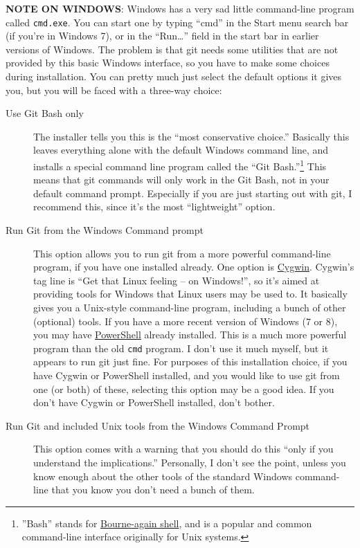 \documentclass{article}
\begin{document}
\textbf{NOTE ON WINDOWS}: Windows has a very sad little command-line program called \texttt{cmd.exe}. You can start one by typing ``cmd'' in the Start menu search bar (if you're in Windows 7), or in the ``Run\ldots{}'' field in the start bar in earlier versions of Windows. The problem is that git needs some utilities that are not provided by this basic Windows interface, so you have to make some choices during installation. You can pretty much just select the default options it gives you, but you will be faced with a three-way choice:
\begin{description}
\item[Use Git Bash only] The installer tells you this is the ``most conservative choice.'' Basically this leaves everything alone with the default Windows command line, and installs a special command line program called the ``Git Bash.''\footnote{''Bash'' stands for \href{http://en.wikipedia.org/wiki/Bash_(Unix_shell)}{Bourne-again shell}, and is a popular and common command-line interface originally for Unix systems.
 } This means that git commands will only work in the Git Bash, not in your default command prompt.  Especially if you are just starting out with git, I recommend this, since it's the most ``lightweight'' option.
\item[Run Git from the Windows Command prompt] This option allows you to run git from a more powerful command-line program, if you have one installed already. One option is \href{http://www.cygwin.com/}{Cygwin}. Cygwin's tag line is ``Get that Linux feeling -- on Windows!'', so it's aimed at providing tools for Windows that Linux users may be used to. It basically gives you a Unix-style command-line program, including a bunch of other (optional) tools. If you have a more recent version of Windows (7 or 8), you may have \href{http://technet.microsoft.com/en-us/library/ms714418.aspx}{PowerShell} already installed. This is a much more powerful program than the old \texttt{cmd} program. I don't use it much myself, but it appears to run git just fine. For purposes of this installation choice, if you have Cygwin or PowerShell installed, and you would like to use git from one (or both) of these, selecting this option may be a good idea.  If you don't have Cygwin or PowerShell installed, don't bother.
\item[Run Git and included Unix tools from the Windows Command Prompt] This option comes with a warning that you should do this ``only if you understand the implications.'' Personally, I don't see the point, unless you know enough about the other tools of the standard Windows command-line that you know you don't need a bunch of them.
\end{description}
\end{document}
